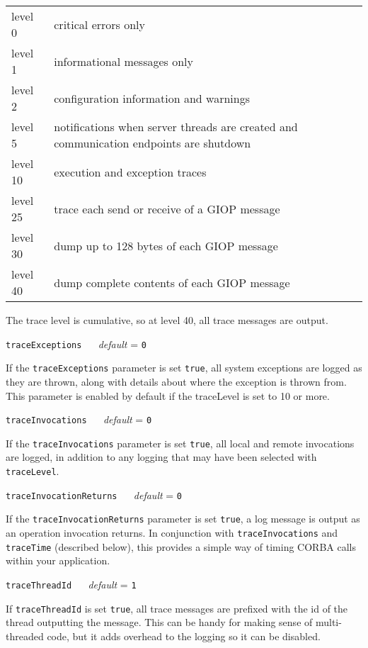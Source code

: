 \documentclass[11pt,oneside,a4paper]{book}
\makeatletter
\newcommand{\code}[1]{\texttt{#1}}
\newcommand{\confopt}[2]
  {\vspace{\baselineskip}\par\noindent\code{#1} ~~ \textit{default} =
   \code{#2}}
\renewcommand{\confopt}[2]
  {\vspace{\baselineskip}\par\noindent\code{#1} ~~ \textit{default} =
   \code{#2}\\[-1ex]\@afterheading}
\makeatother
\begin{document}
\begin{tabular}{lp{}}

level 0      & critical errors only\\
level 1      & informational messages only\\
level 2      & configuration information and warnings\\

level 5      & notifications when server threads are
               created and communication endpoints are shutdown\\

level 10     & execution and exception traces\\
level 25     & trace each send or receive of a GIOP message\\
level 30     & dump up to 128 bytes of each GIOP message\\
level 40     & dump complete contents of each GIOP message\\
\end{tabular}

\vspace{\baselineskip}

\noindent The trace level is cumulative, so at level 40, all trace
messages are output.


\confopt{traceExceptions}{0}

If the \code{traceExceptions} parameter is set \code{true}, all system
exceptions are logged as they are thrown, along with details about
where the exception is thrown from. This parameter is enabled by
default if the traceLevel is set to 10 or more.


\confopt{traceInvocations}{0}

If the \code{traceInvocations} parameter is set \code{true}, all local
and remote invocations are logged, in addition to any logging that may
have been selected with \code{traceLevel}.


\confopt{traceInvocationReturns}{0}

If the \code{traceInvocationReturns} parameter is set \code{true}, a
log message is output as an operation invocation returns. In
conjunction with \code{traceInvocations} and \code{traceTime}
(described below), this provides a simple way of timing CORBA calls
within your application.


\confopt{traceThreadId}{1}

If \code{traceThreadId} is set \code{true}, all trace messages are
prefixed with the id of the thread outputting the message. This can be
handy for making sense of multi-threaded code, but it adds overhead to
the logging so it can be disabled.
\end{document}
